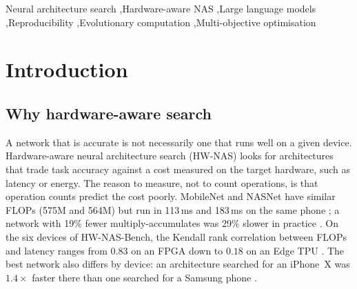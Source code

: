 \documentclass[preprint,12pt,authoryear]{elsarticle}
\begin{document}
\begin{frontmatter}
\begin{keyword}
Neural architecture search \sep Hardware-aware NAS \sep Large language models \sep Reproducibility \sep Evolutionary computation \sep Multi-objective optimisation
\end{keyword}

\end{frontmatter}

\section{Introduction}\label{sec:intro}

\subsection{Why hardware-aware search}
A network that is accurate is not necessarily one that runs well on a given device. Hardware-aware neural architecture search (HW-NAS) looks for architectures that trade task accuracy against a cost measured on the target hardware, such as latency or energy. The reason to measure, not to count operations, is that operation counts predict the cost poorly. MobileNet and NASNet have similar FLOPs (575M and 564M) but run in 113\,ms and 183\,ms on the same phone \citep{mnasnet}; a network with 19\% fewer multiply-accumulates was 29\% slower in practice \citep{netadapt}. On the six devices of HW-NAS-Bench, the Kendall rank correlation between FLOPs and latency ranges from $0.83$ on an FPGA down to $0.18$ on an Edge TPU \citep{hwnasbench}. The best network also differs by device: an architecture searched for an iPhone~X was $1.4\times$ faster there than one searched for a Samsung phone \citep{fbnet}.
\end{document}
